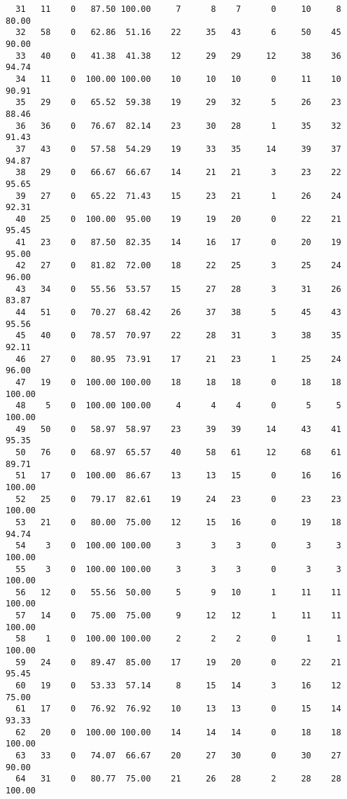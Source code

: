 \begin{verbatim}
  31   11    0   87.50 100.00     7      8    7      0     10     8    80.00
  32   58    0   62.86  51.16    22     35   43      6     50    45    90.00
  33   40    0   41.38  41.38    12     29   29     12     38    36    94.74
  34   11    0  100.00 100.00    10     10   10      0     11    10    90.91
  35   29    0   65.52  59.38    19     29   32      5     26    23    88.46
  36   36    0   76.67  82.14    23     30   28      1     35    32    91.43
  37   43    0   57.58  54.29    19     33   35     14     39    37    94.87
  38   29    0   66.67  66.67    14     21   21      3     23    22    95.65
  39   27    0   65.22  71.43    15     23   21      1     26    24    92.31
  40   25    0  100.00  95.00    19     19   20      0     22    21    95.45
  41   23    0   87.50  82.35    14     16   17      0     20    19    95.00
  42   27    0   81.82  72.00    18     22   25      3     25    24    96.00
  43   34    0   55.56  53.57    15     27   28      3     31    26    83.87
  44   51    0   70.27  68.42    26     37   38      5     45    43    95.56
  45   40    0   78.57  70.97    22     28   31      3     38    35    92.11
  46   27    0   80.95  73.91    17     21   23      1     25    24    96.00
  47   19    0  100.00 100.00    18     18   18      0     18    18   100.00
  48    5    0  100.00 100.00     4      4    4      0      5     5   100.00
  49   50    0   58.97  58.97    23     39   39     14     43    41    95.35
  50   76    0   68.97  65.57    40     58   61     12     68    61    89.71
  51   17    0  100.00  86.67    13     13   15      0     16    16   100.00
  52   25    0   79.17  82.61    19     24   23      0     23    23   100.00
  53   21    0   80.00  75.00    12     15   16      0     19    18    94.74
  54    3    0  100.00 100.00     3      3    3      0      3     3   100.00
  55    3    0  100.00 100.00     3      3    3      0      3     3   100.00
  56   12    0   55.56  50.00     5      9   10      1     11    11   100.00
  57   14    0   75.00  75.00     9     12   12      1     11    11   100.00
  58    1    0  100.00 100.00     2      2    2      0      1     1   100.00
  59   24    0   89.47  85.00    17     19   20      0     22    21    95.45
  60   19    0   53.33  57.14     8     15   14      3     16    12    75.00
  61   17    0   76.92  76.92    10     13   13      0     15    14    93.33
  62   20    0  100.00 100.00    14     14   14      0     18    18   100.00
  63   33    0   74.07  66.67    20     27   30      0     30    27    90.00
  64   31    0   80.77  75.00    21     26   28      2     28    28   100.00

\end{verbatim}
